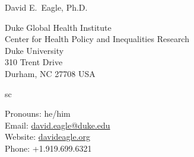 \documentclass[12pt, letter]{article}
\makeatletter
\newcommand{\FirstName}{David E.}
\newcommand{\LastName}{Eagle}
\newcommand{\Degree}{Ph.D.}
\newcommand{\MyName}{\FirstName\ \LastName, \Degree}
\newcommand{\MyRole}{Assistant Research Professor}
\newcommand{\Email}{david.eagle@duke.edu}
\newcommand{\Website}{davideagle.org}
\newcommand{\Phone}{+1.919.699.6321}
\newcommand{\Affiliation}{
Duke Global Health Institute\\
Center for Health Policy and Inequalities Research\\
Duke University
}
\newcommand{\Address}{
    310 Trent Drive\\
    Durham, NC 27708 USA
}
\makeatother
\begin{document}
\setlength{\LTpre}{0pt}
\setlength{\LTpost}{2ex}

\thispagestyle{empty}

\begin{center}
    {\fontsize{24pt}{0}\selectfont \MyName}
    \\[0.3cm]
\end{center}

  \noindent
\begin{minipage}{.6\textwidth}
\Affiliation\\
\Address\\
\end{minipage}sc
\begin{minipage}{.4\textwidth}
\flushright
Pronouns: he/him\\
Email: \href{mailto:\Email}{\texttt\small{\Email}}\\
Website: {\texttt\small\href{\Website}{\Website}}\\
Phone: \Phone\\
\end{minipage}

\vspace{-1em}









%
\end{document}

